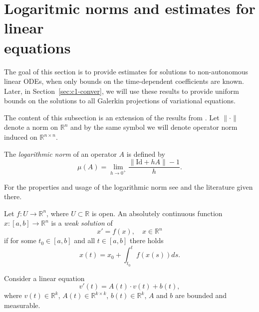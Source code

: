 
\section{Logaritmic norms and estimates for li\-near \\ equa\-tions}
\label{sec:estmlinEq}

The goal of this section is to provide estimates for solutions to non-autonomous linear ODEs, when only bounds on the time-dependent coefficients are known. Later, in Section~\ref{sec:c1-conver}, we will use these results to provide uniform bounds on the solutions to all Galerkin projections of variational equations. 

The content of this subsection is an extension of the results from \cite{KZ}. Let $\| \cdot \|$ denote a norm on $\mathbb{R}^n$  and by the same symbol we will denote operator norm induced on $\mathbb{R}^{n \times n}$. 
\begin{definition} \cite{D58,L58}
The \emph{logarithmic norm} of an operator $A$ is defined by 
\begin{equation*}
  \mu(A)=\lim_{h \to 0^+} \frac{\|\mathrm{Id} + hA \| - 1}{h}.%
\end{equation*}
\end{definition}
For the properties and usage of the logarithmic norm see \cite{KZ} and the literature given there.

\begin{definition}
Let $f :U \to \mathbb{R}^n$, where  $U \subset \mathbb{R}$ is open. An absolutely continuous function $x:[a,b] \to \mathbb{R}^n$ is a \emph{weak solution} of
\begin{equation*}
x'=f(x), \quad  x\in \mathbb{R}^n%
\end{equation*}
if for some $t_0\in[a,b]$ and all $t \in [a,b]$ there holds
\begin{equation*}
	x(t) = x_0 + \int_{t_0}^t f(x(s)) ds.%
\end{equation*}
\end{definition}

Consider a linear equation
\begin{equation}
	v'(t)=A(t) \cdot v(t) + b(t), \label{eq:linnonhp}
\end{equation}
where $v(t) \in \mathbb{R}^k$, $A(t) \in \mathbb{R}^{k \times k}$, $b(t) \in \mathbb{R}^k$, $A$ and $b$ are bounded and measurable.


